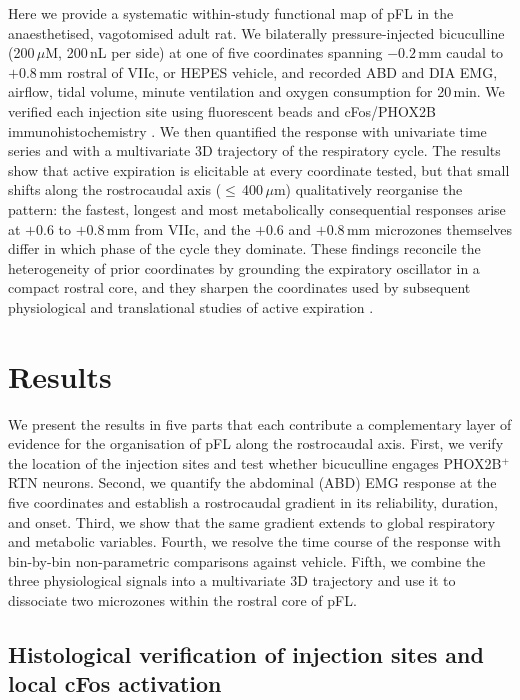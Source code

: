 \documentclass[11pt]{article}
\begin{document}
Here we provide a systematic within-study functional map of pFL in the
anaesthetised, vagotomised adult rat. We bilaterally pressure-injected
bicuculline (200\,$\mu$M, 200\,nL per side) at one of five coordinates
spanning $-0.2$\,mm caudal to $+0.8$\,mm rostral of VIIc, or HEPES
vehicle, and recorded ABD and DIA EMG, airflow, tidal volume, minute
ventilation and oxygen consumption for 20\,min. We verified each injection
site using fluorescent beads and cFos/PHOX2B immunohistochemistry
\citep{Marina2010Essential,Takakura2013Phox2b}. We then quantified the
response with univariate time series and with a multivariate 3D trajectory
of the respiratory cycle. The results show that active expiration is
elicitable at every coordinate tested, but that small shifts along the
rostrocaudal axis ($\leq$\,400\,$\mu$m) qualitatively reorganise the
pattern: the fastest, longest and most metabolically consequential
responses arise at $+0.6$ to $+0.8$\,mm from VIIc, and the $+0.6$ and
$+0.8$\,mm microzones themselves differ in which phase of the cycle they
dominate. These findings reconcile the heterogeneity of prior coordinates
by grounding the expiratory oscillator in a compact rostral core, and
they sharpen the coordinates used by subsequent physiological and
translational studies of active expiration
\citep{Pagliardini2024Parafacial,Jenkin2017Roles,Pisanski2020Parafacial,Pisanski2019Parafacial}.

\section{Results}

We present the results in five parts that each contribute a
complementary layer of evidence for the organisation of pFL along the
rostrocaudal axis. First, we verify the location of the injection sites
and test whether bicuculline engages PHOX2B$^+$ RTN neurons. Second, we
quantify the abdominal (ABD) EMG response at the five coordinates and
establish a rostrocaudal gradient in its reliability, duration, and
onset. Third, we show that the same gradient extends to global
respiratory and metabolic variables. Fourth, we resolve the time course
of the response with bin-by-bin non-parametric comparisons against
vehicle. Fifth, we combine the three physiological signals into a
multivariate 3D trajectory and use it to dissociate two microzones
within the rostral core of pFL.

\subsection{Histological verification of injection sites and local cFos activation}
\end{document}
